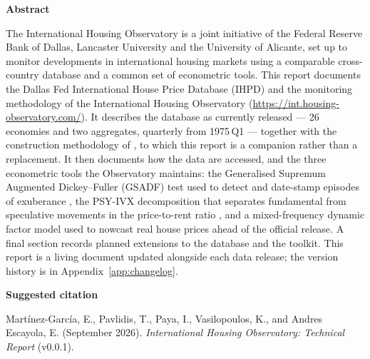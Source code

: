 \documentclass[11pt, a4paper]{article}
\newcommand{\reportversion}{v0.0.1}
\newcommand{\reportdate}{September 2026}
\begin{document}
\thispagestyle{plain}

\begin{tcolorbox}[enhanced, colback=iholight, colframe=ihoblue, boxrule=0pt,
                  leftrule=3pt, sharp corners, left=12pt, right=12pt,
                  top=10pt, bottom=10pt]
{\sffamily\large\bfseries\color{ihoblue}Abstract}\par\medskip
  The International Housing Observatory is a joint initiative of the Federal
  Reserve Bank of Dallas, Lancaster University and the University of Alicante,
  set up to monitor developments in international housing markets using a
  comparable cross-country database and a common set of econometric tools.
  This report documents the Dallas Fed International House Price Database
  (IHPD) and the monitoring methodology of the International Housing
  Observatory (\url{https://int.housing-observatory.com/}). It describes the
  database as currently released --- 26 economies and two aggregates,
  quarterly from 1975\,Q1 --- together with the construction methodology of
  \citet{mack2011}, to which this report is a companion rather than a
  replacement. It then documents how the data are accessed, and the three
  econometric tools the Observatory maintains: the Generalised Supremum
  Augmented Dickey--Fuller (GSADF) test used to detect and date-stamp
  episodes of exuberance \citep{phillips2015a, phillips2015b}, the PSY-IVX
  decomposition that separates fundamental from speculative movements in the
  price-to-rent ratio \citep{shi2021}, and a mixed-frequency dynamic factor
  model used to nowcast real house prices ahead of the official release.
  A final section records planned extensions to the database and the toolkit.
  This report is a living document updated alongside each data release; the
  version history is in Appendix~\ref{app:changelog}.
\end{tcolorbox}

\begin{tcolorbox}[colback=white, colframe=ihorule, boxrule=0.6pt,
                  sharp corners, left=12pt, right=12pt, fontupper=\small]
{\sffamily\bfseries\color{ihoblue}Suggested citation}\par\smallskip
Mart\'{i}nez-Garc\'{i}a, E., Pavlidis, T., Paya, I., Vasilopoulos, K.,
and Andres Escayola, E. (\reportdate).
\textit{International Housing Observatory: Technical Report}
(\reportversion).
\end{tcolorbox}
\end{document}
